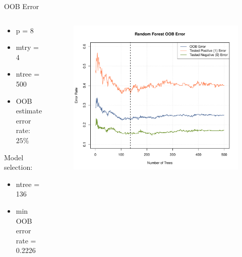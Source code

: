 
\begin{frame}{OOB Error}

\begin{columns}
\begin{column}{0.35\textwidth}
{\footnotesize \begin{itemize}
    \item p = 8
    \item mtry = 4 
    \item ntree = 500
    \item OOB estimate error rate: $25\%$
\end{itemize}}

\vspace{0.5cm}

\; Model selection:
{\footnotesize \begin{itemize}
    \item ntree = 136
    \item min OOB error rate = 0.2226
\end{itemize}}

\end{column}
\begin{column}{0.75\textwidth}
\begin{figure}
\includegraphics[width=1.05\columnwidth]{slide/Figures/forest/diabete_forest_error4.pdf}
\end{figure}
\end{column}
\end{columns}

\end{frame}

